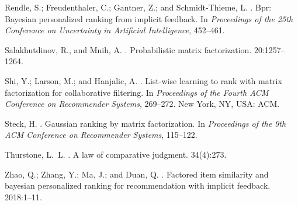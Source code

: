 \documentclass[letterpaper]{article} %
\begin{document}
\begin{thebibliography}{}
Rendle, S.; Freudenthaler, C.; Gantner, Z.; and Schmidt-Thieme, L.
.
\newblock Bpr: Bayesian personalized ranking from implicit feedback.
\newblock In {\em Proceedings of the 25th Conference on Uncertainty in
  Artificial Intelligence},  452--461.

Salakhutdinov, R., and Mnih, A.
.
\newblock Probabilistic matrix factorization.
  20:1257--1264.

Shi, Y.; Larson, M.; and Hanjalic, A.
.
\newblock List-wise learning to rank with matrix factorization for
  collaborative filtering.
\newblock In {\em Proceedings of the Fourth ACM Conference on Recommender
  Systems},  269--272.
\newblock New York, NY, USA: ACM.

Steck, H.
.
\newblock Gaussian ranking by matrix factorization.
\newblock In {\em Proceedings of the 9th ACM Conference on Recommender
  Systems},  115--122.

Thurstone, L.~L.
.
\newblock A law of comparative judgment.
 34(4):273.

Zhao, Q.; Zhang, Y.; Ma, J.; and Duan, Q.
.
\newblock Factored item similarity and bayesian personalized ranking for
  recommendation with implicit feedback.
 2018:1--11.

\end{thebibliography}
\end{document}
